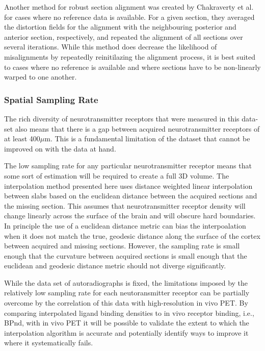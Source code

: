 \documentclass[12pt]{article}
\begin{document}
Another method for robust section alignment was created by Chakraverty et al. \cite{Charkravarty2006} for cases where no reference data is available. For a given section, they averaged the distortion fields for the alignment with the neighbouring posterior and anterior section, respectively, and repeated the alignment of all sections over several iterations. While this method does decrease the likelihood of misalignments by repeatedly reinitilazing the alignment process, it is best suited to cases where no reference is available and where sections have to be non-linearly warped to one another. 


\subsubsection{Spatial Sampling Rate}
The rich diversity of neurotransmitter receptors that were measured in this data-set also means that there is a gap between acquired neurotransmitter receptors of at least 400$\mu$m.  This is a fundamental limitation of the dataset that cannot be improved on with the data at hand. 

The low sampling rate for any particular neurotransmitter receptor means that some sort of estimation will be required to create a full 3D volume. The interpolation method presented here uses distance weighted linear interpolation between slabs based on the euclidean distance between the acquired sections and the missing section. This assumes that neurotransmitter receptor density will change linearly across the surface of the brain and will obscure hard boundaries. In principle the use of a euclidean distance metric can bias the interpoalation when it does not match the true, geodesic distance along the surface of the cortex between acquired and missing sections. However, the sampling rate is small enough that the curvature between acquired sections is small enough that the euclidean and geodesic distance metric should not diverge significantly. 

While the data set of autoradiographs is fixed, the limitations imposed by the relatively low sampling rate for each neutoransmitter receptor can be partially overcome by the correlation of this data with high-resolution in vivo PET. By comparing interpolated ligand binding densities to in vivo receptor binding, i.e., BPnd, with in vivo PET it will be possible to validate the extent to which the interpolation algorithm is accurate and potentially identify ways to improve it where it systematically fails. 
\end{document}

